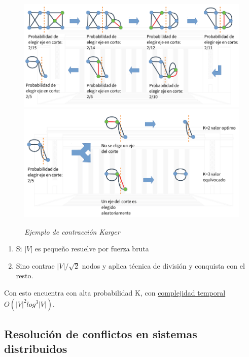 \documentclass{article}
\begin{document}
\begin{figure}[h!]
    \begin{center} 
    \includegraphics[width=\linewidth]{imagenes/ejemplo-contraccion1.png}
    \includegraphics[width=\linewidth]{imagenes/ejemplo-contraccion2.png}
    \caption{\small \sl Ejemplo de contracción Karger} 
    \end{center}
\end{figure}



\begin{enumerate}
    \item Si \(|V|\) es pequeño resuelve por fuerza bruta
    \item Sino contrae \(|V|/\sqrt{2}\) nodos y aplica técnica de división y conquista con el resto.
\end{enumerate}

Con esto encuentra con alta probabilidad K, con \underline{complejidad temporal \(O(|V|^2 log^3 |V|)\)}.

\newpage
\subsection{Resolución de conflictos en sistemas distribuidos}
\end{document}

